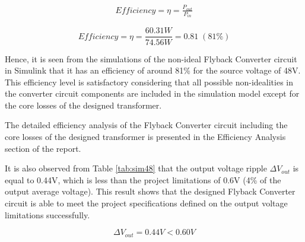 \begin{align}
    Efficiency = \eta = \frac{P_{out}}{P_{in}}
    \label{eqn:eff48}
\end{align}

$$ Efficiency = \eta = \frac{60.31W}{74.56W} = 0.81\;(81\%) $$

Hence, it is seen from the simulations of the non-ideal Flyback Converter circuit in Simulink that it has an efficiency of around 81\% for the source voltage of 48V. This efficiency level is satisfactory considering that all possible non-idealities in the converter circuit components are included in the simulation model except for the core losses of the designed transformer. 

The detailed efficiency analysis of the Flyback Converter circuit including the core losses of the designed transformer is presented in the Efficiency Analysis section of the report.

It is also observed from Table \ref{tab:sim48} that the output voltage ripple $\Delta V_{out}$ is equal to 0.44V, which is less than the project limitations of 0.6V (4\% of the output average voltage). This result shows that the designed Flyback Converter circuit is able to meet the project specifications  defined on the output voltage limitations successfully.

$$ \Delta V_{out} = 0.44V < 0.60V $$